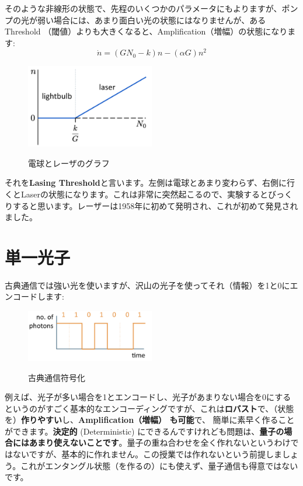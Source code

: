 そのような非線形の状態で、先程のいくつかのパラメータにもよりますが、ポンプの光が弱い場合には、あまり面白い光の状態にはなりませんが、あるThreshold （閾値）よりも大きくなると、Amplification（増幅）の状態になります:
\begin{equation}
\dot{n}=\left(G N_{0}-k\right) n-(\alpha G) n^{2}
\end{equation}
\begin{figure}[H]
    \centering
    \includegraphics[width=0.5\textwidth]{lesson5/lightbulb_and_laser.pdf}
    \label{図: 1}
    \caption{電球とレーザのグラフ}
\end{figure}
それを\textbf{Lasing Threshold}と言います。左側は電球とあまり変わらず、右側に行くとLaserの状態になります。これは非常に突然起こるので、実験するとびっくりすると思います。レーザーは1958年に初めて発明され、これが初めて発見されました。



\section{単一光子}
古典通信では強い光を使いますが、沢山の光子を使ってそれ（情報）を1と0にエンコードします:
\begin{figure}[H]
    \centering
    \includegraphics[width=0.5\textwidth]{lesson5/classical_encoding.pdf}
    \label{図: 1}
    \caption{古典通信符号化}
\end{figure}
例えば、光子が多い場合を1とエンコードし、光子があまりない場合を0にするというのがすごく基本的なエンコーディングですが、これは\textbf{ロバスト}で、（状態を）\textbf{作りやすい}し、\textbf{Amplification（増幅） も可能}で、 簡単に素早く作ることができます。\textbf{決定的} (Deterministic) にできるんですけれども問題は、\textbf{量子の場合にはあまり使えないことです}。量子の重ね合わせを全く作れないというわけではないですが、基本的に作れません。この授業では作れないという前提しましょう。これがエンタングル状態（を作るの）にも使えず、量子通信も得意ではないです。

